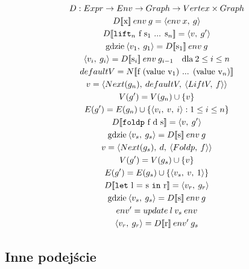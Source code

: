 \documentclass[11pt,leqno]{article}
\newcommand{\denote}[1]{\text{$[\![ $#1$ ]\!]$}}
\begin{document}
\begin {gather}
D : Expr \rightarrow Env \rightarrow Graph \rightarrow Vertex \times Graph \\  
D\denote{x}\:env\:g = \langle env\:x,\:g \rangle \\
D\denote{\texttt{lift$_{n}$} f s$_{1}$ ... s$_{n}$} = \langle v,\:g' \rangle \\
\text{gdzie} \: \langle v_{1},\:g_{1} \rangle = D\denote{s$_{1}$}\:env\:g \\
\langle v_{i},\:g_{i} \rangle = D\denote{s$_{i}$}\:env\:g_{i-1} \quad \text{dla}\:2 \leq i \leq n \\
defaultV = N\denote{f (value v$_{1}$) ... (value v$_{n}$)} \\
v = \langle Next(g_{n}),\:defaultV,\:\langle LiftV,\:f \rangle \rangle \\
V(g') = V(g_{n}) \cup \left\{ {v}\right\} \\
E(g') = E(g_{n}) \cup \{\langle v_{i},\:v,\:i \rangle : 1 \leq i \leq n\} \\
D\denote{\texttt{foldp} f d s} = \langle v,\:g' \rangle \\
\text{gdzie} \: \langle v_{s},\:g_{s} \rangle = D\denote{s}\:env\:g \\
v = \langle Next(g_{s}),\:d,\:\langle Foldp,\:f \rangle \rangle \\
V(g') = V(g_{s}) \cup \left\{ {v}\right\} \\
E(g') = E(g_{s}) \cup \{\langle v_{s},\:v,\:1 \rangle \} \\
D\denote{\texttt{let} l = s \texttt{in} r} = \langle v_{r},\:g_{r} \rangle \\
\text{gdzie} \: \langle v_{s},\:g_{s} \rangle = D\denote{s}\:env\:g \\
env' = update\:l\:v_{s}\:env \\
\langle v_{r},\:g_{r} \rangle = D\denote{r}\:env'\:g_{s}
\end{gather}

\subsection{Inne podejście}
\end{document}
